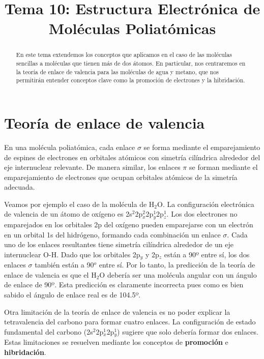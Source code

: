 \documentclass{tufte-handout}
\title[Química Física II: Tema 10 - Moléculas poliatómicas]{
Tema 10: Estructura Electrónica de Moléculas Poliatómicas}
\date{}  %
\begin{document}
\maketitle%

\begin{abstract}
\noindent 
En este tema extendemos los conceptos que aplicamos en
el caso de las moléculas sencillas a moléculas que tienen
más de dos átomos. En particular, nos centraremos en la 
teoría de enlace de valencia para las moléculas de
agua y metano, que nos permitirán entender 
conceptos clave como la promoción de electrones y la
hibridación.
\end{abstract}




\section{Teoría de enlace de valencia}

En una molécula poliatómica, cada enlace $\sigma$ se forma mediante
el emparejamiento de espines de electrones en orbitales atómicos 
con simetría cilíndrica alrededor del eje internuclear relevante. 
De manera similar, los enlaces $\pi$ se forman mediante el 
emparejamiento de electrones que ocupan orbitales atómicos de 
la simetría adecuada.

Veamos por ejemplo el caso de la molécula de H$_2$O. La 
configuración electrónica de valencia de un átomo de oxígeno es 
2s$^2$2p$_x^2$2p$_y^1$2p$^1_z$. Los dos electrones 
no emparejados en los orbitales 2p del oxígeno pueden emparejarse
con un electrón en un orbital 1s del hidrógeno, formando cada
combinación un enlace $\sigma$.  Cada uno de los enlaces 
resultantes tiene simetría cilíndrica alrededor de un eje internuclear
O-H. Dado que los orbitales 2p$_y$ y 2p$_z$ están a 90º entre sí,
los dos enlaces $\sigma$ también están a 90$^o$ entre sí. Por lo
tanto, la predicción de la teoría de enlace de valencia es que el 
H$_2$O debería ser una molécula angular con un ángulo de enlace 
de 90º. Esta predicción es claramente incorrecta pues como es
bien sabido el ángulo de enlace real es de 104.5º.


Otra limitación de la teoría de enlace de valencia es no poder
explicar la tetravalencia del carbono para formar cuatro enlaces. 
La configuración de estado fundamental del carbono 
(2s$^2$2p$^1_x$2p$_y^1$) sugiere que solo debería formar dos
enlaces.
Estas limitaciones se resuelven mediante los conceptos de 
\textbf{promoción} e \textbf{hibridación}. 
\end{document}
